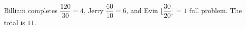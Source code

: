 Billiam completes $\dfrac{120}{30}=4$, Jerry $\dfrac{60}{10}=6$, and Evin $\lfloor\dfrac{30}{20}\rfloor=1$ full problem. The total is $\boxed{11}$.
